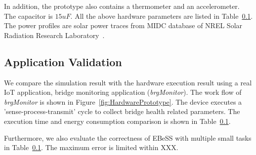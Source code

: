 In addition, the prototype also contains a thermometer and an accelerometer. 
The capacitor is $15uF$. 
All the above hardware parameters are listed in Table~\ref{}.
The power profiles are solar power traces from MIDC database of NREL Solar Radiation Research Laboratory~\cite{midc2015solar}.

\subsection{Application Validation}
We compare the simulation result with the hardware execution result using a real IoT application, bridge monitoring application (\emph{brgMonitor}).
The work flow of \emph{brgMonitor} is shown in Figure~\ref{fig:HardwarePrototype}.
The device executes a 'sense-process-transmit' cycle to collect bridge health related parameters.
The execution time and energy consumption comparison is shown in Table~\ref{}.

Furthermore, we also evaluate the correctness of EBeSS with multiple small tasks in Table~\ref{}.
The maximum error is limited within XXX.

%
%

\begin{comment}

 
\end{comment}